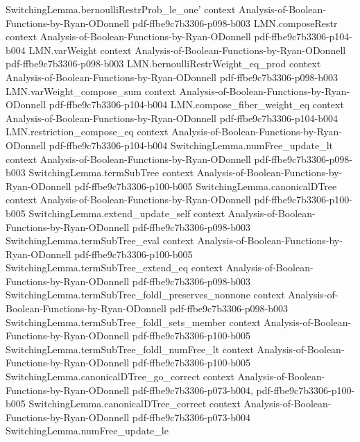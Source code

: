 \begin{lemma}
  {SwitchingLemma.bernoulliRestrProb_le_one'}
  {context}
  {Analysis-of-Boolean-Functions-by-Ryan-ODonnell}
  {pdf-ffbe9c7b3306-p098-b003}
\proofstep
  {LMN.composeRestr}
  {context}
  {Analysis-of-Boolean-Functions-by-Ryan-ODonnell}
  {pdf-ffbe9c7b3306-p104-b004}
\proofstep
  {LMN.varWeight}
  {context}
  {Analysis-of-Boolean-Functions-by-Ryan-ODonnell}
  {pdf-ffbe9c7b3306-p098-b003}
\proofstep
  {LMN.bernoulliRestrWeight_eq_prod}
  {context}
  {Analysis-of-Boolean-Functions-by-Ryan-ODonnell}
  {pdf-ffbe9c7b3306-p098-b003}
\proofstep
  {LMN.varWeight_compose_sum}
  {context}
  {Analysis-of-Boolean-Functions-by-Ryan-ODonnell}
  {pdf-ffbe9c7b3306-p104-b004}
\proofstep
  {LMN.compose_fiber_weight_eq}
  {context}
  {Analysis-of-Boolean-Functions-by-Ryan-ODonnell}
  {pdf-ffbe9c7b3306-p104-b004}
\proofstep
  {LMN.restriction_compose_eq}
  {context}
  {Analysis-of-Boolean-Functions-by-Ryan-ODonnell}
  {pdf-ffbe9c7b3306-p104-b004}
\proofstep
  {SwitchingLemma.numFree_update_lt}
  {context}
  {Analysis-of-Boolean-Functions-by-Ryan-ODonnell}
  {pdf-ffbe9c7b3306-p098-b003}
\proofstep
  {SwitchingLemma.termSubTree}
  {context}
  {Analysis-of-Boolean-Functions-by-Ryan-ODonnell}
  {pdf-ffbe9c7b3306-p100-b005}
\proofstep
  {SwitchingLemma.canonicalDTree}
  {context}
  {Analysis-of-Boolean-Functions-by-Ryan-ODonnell}
  {pdf-ffbe9c7b3306-p100-b005}
\proofstep
  {SwitchingLemma.extend_update_self}
  {context}
  {Analysis-of-Boolean-Functions-by-Ryan-ODonnell}
  {pdf-ffbe9c7b3306-p098-b003}
\proofstep
  {SwitchingLemma.termSubTree_eval}
  {context}
  {Analysis-of-Boolean-Functions-by-Ryan-ODonnell}
  {pdf-ffbe9c7b3306-p100-b005}
\proofstep
  {SwitchingLemma.termSubTree_extend_eq}
  {context}
  {Analysis-of-Boolean-Functions-by-Ryan-ODonnell}
  {pdf-ffbe9c7b3306-p098-b003}
\proofstep
  {SwitchingLemma.termSubTree_foldl_preserves_nonnone}
  {context}
  {Analysis-of-Boolean-Functions-by-Ryan-ODonnell}
  {pdf-ffbe9c7b3306-p098-b003}
\proofstep
  {SwitchingLemma.termSubTree_foldl_sets_member}
  {context}
  {Analysis-of-Boolean-Functions-by-Ryan-ODonnell}
  {pdf-ffbe9c7b3306-p100-b005}
\proofstep
  {SwitchingLemma.termSubTree_foldl_numFree_lt}
  {context}
  {Analysis-of-Boolean-Functions-by-Ryan-ODonnell}
  {pdf-ffbe9c7b3306-p100-b005}
\proofstep
  {SwitchingLemma.canonicalDTree_go_correct}
  {context}
  {Analysis-of-Boolean-Functions-by-Ryan-ODonnell}
  {pdf-ffbe9c7b3306-p073-b004,
    pdf-ffbe9c7b3306-p100-b005}
\proofstep
  {SwitchingLemma.canonicalDTree_correct}
  {context}
  {Analysis-of-Boolean-Functions-by-Ryan-ODonnell}
  {pdf-ffbe9c7b3306-p073-b004}
\proofstep
  {SwitchingLemma.numFree_update_le}

\end{lemma}
